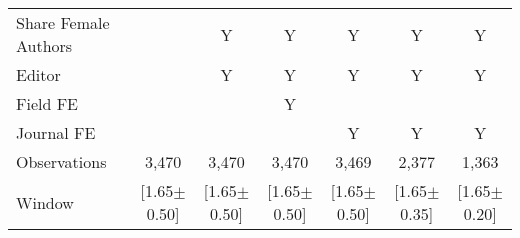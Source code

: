 \begin{tabular}{l*{6}{c}}
Share Female Authors &         &        Y&        Y&        Y&        Y&        Y\\
Editor          &         &        Y&        Y&        Y&        Y&        Y\\
Field FE        &         &         &        Y&         &         &         \\
Journal FE      &         &         &         &        Y&        Y&        Y\\
\hline
Observations    &    3,470&    3,470&    3,470&    3,469&    2,377&    1,363\\
Window          &[1.65$\pm$0.50]&[1.65$\pm$0.50]&[1.65$\pm$0.50]&[1.65$\pm$0.50]&[1.65$\pm$0.35]&[1.65$\pm$0.20]\\
\hline\hline
\end{tabular}
